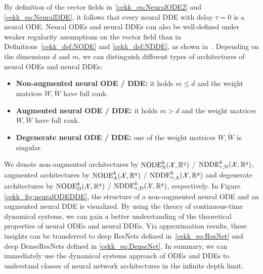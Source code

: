 \documentclass[10pt]{article}
\begin{document}
By definition of the vector fields in~\eqref{cekk_eq:NeuralODE2} and \eqref{cekk_eq:NeuralDDE}, it follows that every neural DDE with delay $\tau = 0$ is a neural ODE. Neural ODEs and neural DDEs can also be well-defined under weaker regularity assumptions on the vector field than in Definitions~\ref{cekk_def:NODE} and \ref{cekk_def:NDDE}, as shown in~\cite{KuehnKuntz2023, KuehnKuntz2025}.
Depending on the dimensions $d$ and $m$, we can distinguish different types of architectures of neural ODEs and neural DDEs:
\begin{itemize}
	\item \textbf{Non-augmented neural ODE / DDE:}  it holds $m\leq d$ and the weight matrices $W,\widetilde W$ have full rank.
	\item \textbf{Augmented neural ODE / DDE:}   it holds $m> d$ and the weight matrices $W,\widetilde W$ have full rank.
	\item \textbf{Degenerate neural ODE / DDE:} one of the weight matrices $W,\widetilde W$ is singular.
\end{itemize}
We denote non-augmented architectures by $\textup{NODE}^k_\text{N}(\mathcal{X},\mathbb{R}^q)$ / $\textup{NDDE}^k_{\tau,\text{N}}(\mathcal{X},\mathbb{R}^q)$, augmented architectures by $\textup{NODE}^k_{\text{A}}(\mathcal{X},\mathbb{R}^q)$ / $\textup{NDDE}^k_{\tau,\text{A}}(\mathcal{X},\mathbb{R}^q)$ and degenerate architectures by $\textup{NODE}^k_{\text{D}}(\mathcal{X},\mathbb{R}^q)$ / $\textup{NDDE}^k_{\tau,\text{D}}(\mathcal{X},\mathbb{R}^q)$, respectively. In Figure \ref{cekk_fig:neuralODEDDE}, the structure of a non-augmented neural ODE and an augmented neural DDE is visualized. By using the theory of continuous-time dynamical systems, we can gain a better understanding of the theoretical properties of neural ODEs and neural DDEs. Via approximation results, these insights can be transferred to deep ResNets defined in~\eqref{cekk_eq:ResNet} and deep DenseResNets defined in \eqref{cekk_eq:DenseNet}. In summary, we can immediately use the dynamical systems approach of ODEs and DDEs to understand classes of neural network architectures in the infinite depth limit.
\end{document}

